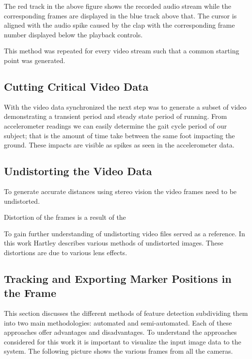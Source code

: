 The red track in the above figure shows the recorded audio stream while the corresponding frames are displayed in the blue track above that. The cursor is aligned with the audio spike caused by the clap with the corresponding frame number displayed below the playback controls.

This method was repeated for every video stream such that a common starting point was generated. 

\subsection{Cutting Critical Video Data}
With the video data synchronized the next step was to generate a subset of video demonstrating a transient period and steady state period of running. From accelerometer readings we can easily determine the gait cycle period of our subject; that is the amount of time take between the same foot impacting the ground. These impacts are visible as spikes as seen in the accelerometer data.  

\subsection{Undistorting the Video Data}
To generate accurate distances using stereo vision the video frames need to be undistorted.

Distortion of the frames is a result of the 

To gain further understanding of undistorting video files \cite{Hartley2004} served as a reference. In this work Hartley describes various methods of undistorted images. These distortions are due to various lens effects.

\subsection{Tracking and Exporting Marker Positions in the Frame}

This section discusses the different methods of feature detection subdividing them into two main methodologies: automated and semi-automated. Each of these approaches offer advantages and disadvantages. To understand the approaches considered for this work it is important to visualize the input image data to the system. The following picture shows the various frames from all the cameras.

